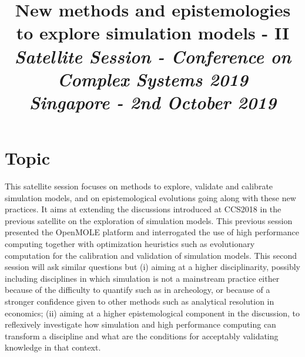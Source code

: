 \documentclass[11pt]{article}
\begin{document}
\title{\vspace{-2cm}New methods and epistemologies to explore simulation models - II
\bigskip\\
\textit{Satellite Session - Conference on Complex Systems 2019}\\
\textit{Singapore - 2nd October 2019}
}

\date{}

\maketitle

\justify






\section*{Topic}

This satellite session focuses on methods to explore, validate and calibrate simulation models, and on epistemological evolutions going along with these new practices. It aims at extending the discussions introduced at CCS2018 in the previous satellite on the exploration of simulation models. This previous session presented the OpenMOLE platform and interrogated the use of high performance computing together with optimization heuristics such as evolutionary computation for the calibration and validation of simulation models. This second session will ask similar questions but (i) aiming at a higher disciplinarity, possibly including disciplines in which simulation is not a mainstream practice either because of the difficulty to quantify such as in archeology, or because of a stronger confidence given to other methods such as analytical resolution in economics; (ii) aiming at a higher epistemological component in the discussion, to reflexively investigate how simulation and high performance computing can transform a discipline and what are the conditions for acceptably validating knowledge in that context. 
\end{document}

